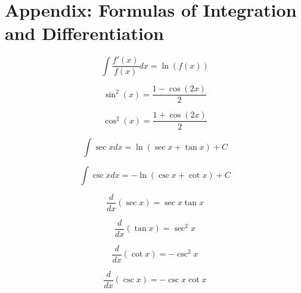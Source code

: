 \documentclass[a4paper,9pt]{scrartcl}
\begin{document}
    \section{Appendix: Formulas of Integration and Differentiation}

    \begin{displaymath}
        \int \frac{f'(x)}{f(x)} dx = \ln(f(x))
    \end{displaymath}

    \begin{displaymath}
        \sin^2(x) = \frac{1-\cos(2x)}{2}
    \end{displaymath}

    \begin{displaymath}
        \cos^2(x) = \frac{1+\cos(2x)}{2}
    \end{displaymath}

    \begin{displaymath}
        \int{\sec{x}}dx = \ln{(\sec{x} + \tan{x})} + C
    \end{displaymath}

    \begin{displaymath}
        \int{\csc{x}}dx = -\ln({\csc{x} + \cot{x}}) + C
    \end{displaymath}

    \begin{displaymath}
        \frac{d}{dx}(\sec{x}) = \sec{x}\tan{x}
    \end{displaymath}

    \begin{displaymath}
        \frac{d}{dx}(\tan{x}) = \sec^2{x}
    \end{displaymath}

    \begin{displaymath}
        \frac{d}{dx}(\cot{x}) = -\csc^2{x}
    \end{displaymath}

    \begin{displaymath}
        \frac{d}{dx}(\csc{x}) = -\csc{x}\cot{x}
    \end{displaymath}
\end{document}

